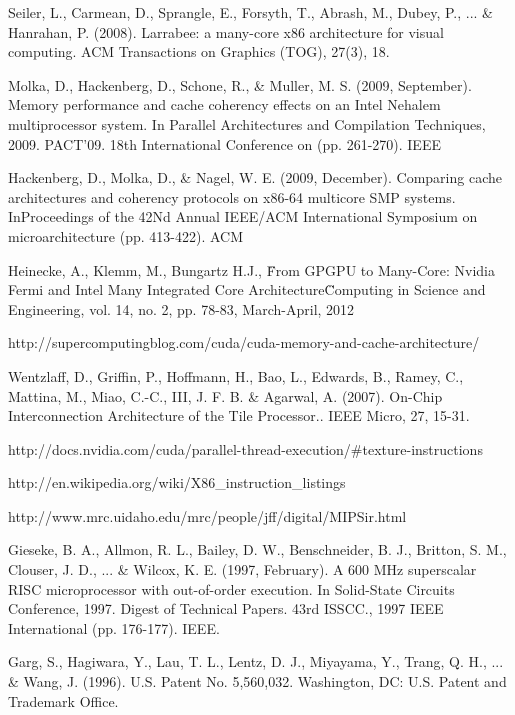 \begin{thebibliography}{99}
 Seiler, L., Carmean, D., Sprangle, E., Forsyth, T., Abrash, M., Dubey, P., ... \& Hanrahan, P. (2008). Larrabee: a many-core x86 architecture for visual computing. ACM Transactions on Graphics (TOG), 27(3), 18.

 Molka, D., Hackenberg, D., Schone, R., \& Muller, M. S. (2009, September). Memory performance and cache coherency effects on an Intel Nehalem multiprocessor system. In Parallel Architectures and Compilation Techniques, 2009. PACT'09. 18th International Conference on (pp. 261-270). IEEE

 Hackenberg, D., Molka, D., \& Nagel, W. E. (2009, December). Comparing cache architectures and coherency protocols on x86-64 multicore SMP systems. InProceedings of the 42Nd Annual IEEE/ACM International Symposium on microarchitecture (pp. 413-422). ACM

 Heinecke, A., Klemm, M., Bungartz H.J., \"From GPGPU to Many-Core: Nvidia Fermi and Intel Many Integrated Core Architecture\" Computing in Science and Engineering, vol. 14, no. 2, pp. 78-83, March-April, 2012 

 http://supercomputingblog.com/cuda/cuda-memory-and-cache-architecture/

 Wentzlaff, D., Griffin, P., Hoffmann, H., Bao, L., Edwards, B., Ramey, C., Mattina, M., Miao, C.-C., III, J. F. B. \& Agarwal, A. (2007). On-Chip Interconnection Architecture of the Tile Processor.. IEEE Micro, 27, 15-31. 

 http://docs.nvidia.com/cuda/parallel-thread-execution/\#texture-instructions

 http://en.wikipedia.org/wiki/X86\_instruction\_listings

 http://www.mrc.uidaho.edu/mrc/people/jff/digital/MIPSir.html

 Gieseke, B. A., Allmon, R. L., Bailey, D. W., Benschneider, B. J., Britton, S. M., Clouser, J. D., ... \& Wilcox, K. E. (1997, February). A 600 MHz superscalar RISC microprocessor with out-of-order execution. In Solid-State Circuits Conference, 1997. Digest of Technical Papers. 43rd ISSCC., 1997 IEEE International (pp. 176-177). IEEE.

Garg, S., Hagiwara, Y., Lau, T. L., Lentz, D. J., Miyayama, Y., Trang, Q. H., ... \& Wang, J. (1996). U.S. Patent No. 5,560,032. Washington, DC: U.S. Patent and Trademark Office.


\end{thebibliography}
